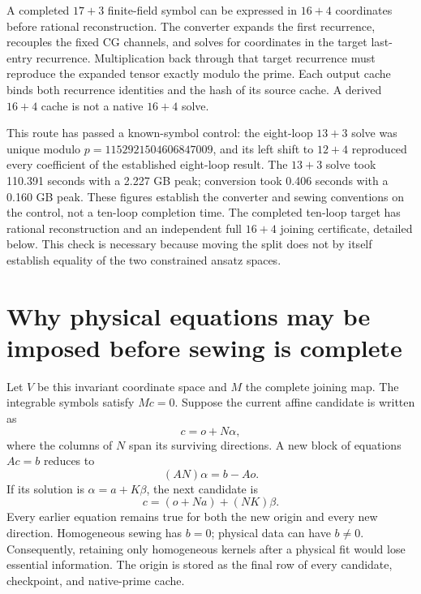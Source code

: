\documentclass[11pt]{article}
\begin{document}
A completed $17+3$ finite-field symbol can be expressed in $16+4$
coordinates before rational reconstruction. The converter expands the first
recurrence, recouples the fixed CG channels, and solves for coordinates in
the target last-entry recurrence. Multiplication back through that target
recurrence must reproduce the expanded tensor exactly modulo the prime.
Each output cache binds both recurrence identities and the hash of its
source cache. A derived $16+4$ cache is not a native $16+4$ solve.

This route has passed a known-symbol control: the eight-loop $13+3$ solve
was unique modulo $p=1152921504606847009$, and its left shift to $12+4$
reproduced every coefficient of the established eight-loop result. The
$13+3$ solve took 110.391 seconds with a 2.227 GB peak; conversion took
0.406 seconds with a 0.160 GB peak. These figures establish the converter
and sewing conventions on the control, not a ten-loop completion time.
The completed ten-loop target has rational reconstruction and an independent
full $16+4$ joining certificate, detailed below. This check is necessary
because moving the split does not by itself establish equality of the two
constrained ansatz spaces.

\section{Why physical equations may be imposed before sewing is complete}
Let $V$ be this invariant coordinate space and $M$ the complete joining map.
The integrable symbols satisfy $Mc=0$. Suppose the current affine candidate
is written as
\begin{equation}\label{eq:affine}
 c=o+N\alpha,
\end{equation}
where the columns of $N$ span its surviving directions. A new block of
equations $Ac=b$ reduces to
\begin{equation}
 (AN)\alpha=b-Ao.
\end{equation}
If its solution is $\alpha=a+K\beta$, the next candidate is
\begin{equation}\label{eq:update}
 c=(o+Na)+(NK)\beta.
\end{equation}
Every earlier equation remains true for both the new origin and every new
direction. Homogeneous sewing has $b=0$; physical data can have $b\ne0$.
Consequently, retaining only homogeneous kernels after a physical fit would
lose essential information. The origin is stored as the final row of every
candidate, checkpoint, and native-prime cache.
\end{document}
